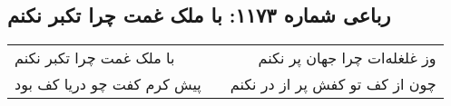 \begin{center}
\section*{رباعی شماره ۱۱۷۳: با ملک غمت چرا تکبر نکنم}
\label{sec:1173}
\begin{longtable}{l p{0.5cm} r}
با ملک غمت چرا تکبر نکنم
&&
وز غلغله‌ات چرا جهان پر نکنم
\\
پیش کرم کفت چو دریا کف بود
&&
چون از کف تو کفش پر از در نکنم
\\
\end{longtable}
\end{center}
